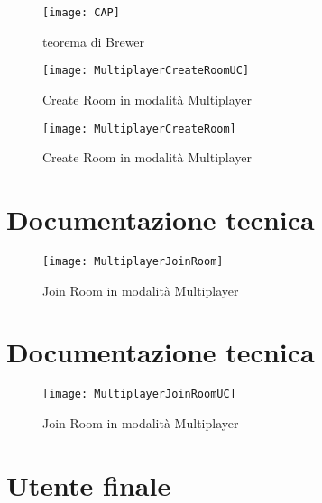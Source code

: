 \documentclass[paper=a4, fontsize=11pt]{scrartcl} %
\numberwithin{equation}{section} %
\numberwithin{figure}{section} %
\numberwithin{table}{section} %
\begin{document}
\begin{figure}
\centering
\texttt{[image: CAP]}
\caption{teorema di Brewer}
\label{CAP}
\end{figure}

\begin{figure}
\centering
\texttt{[image: MultiplayerCreateRoomUC]}
\caption{Create Room in modalità Multiplayer}
\label{CreateRoomUC}
\end{figure}

\begin{figure}
\centering
\texttt{[image: MultiplayerCreateRoom]}
\caption{Create Room in modalità Multiplayer}
\label{CreateRoom}
\end{figure}

\section{Documentazione tecnica}
\begin{figure}
\centering
\texttt{[image: MultiplayerJoinRoom]}
\caption{Join Room in modalità Multiplayer}
\label{JoinRoom}
\end{figure}

\section{Documentazione tecnica}
\begin{figure}
\centering
\texttt{[image: MultiplayerJoinRoomUC]}
\caption{Join Room in modalità Multiplayer}
\label{JoinRoomUC}
\end{figure}

\section{Utente finale}
\end{document}
